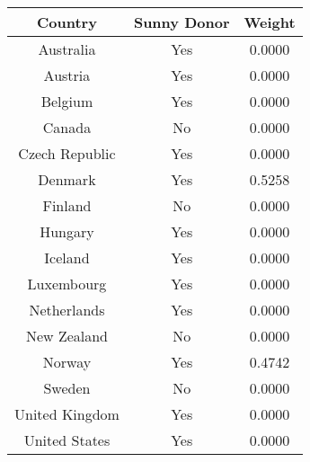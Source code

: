\begin{tabular}{c|c|c}
\textbf{Country}&\textbf{Sunny Donor}&\textbf{Weight}\\
\hline 
Australia & Yes & 0.0000 \\ 
Austria & Yes & 0.0000 \\ 
Belgium & Yes & 0.0000 \\ 
Canada & No & 0.0000 \\ 
Czech Republic & Yes & 0.0000 \\ 
Denmark & Yes & 0.5258 \\ 
Finland & No & 0.0000 \\ 
Hungary & Yes & 0.0000 \\ 
Iceland & Yes & 0.0000 \\ 
Luxembourg & Yes & 0.0000 \\ 
Netherlands & Yes & 0.0000 \\ 
New Zealand & No & 0.0000 \\ 
Norway & Yes & 0.4742 \\ 
Sweden & No & 0.0000 \\ 
United Kingdom & Yes & 0.0000 \\ 
United States & Yes & 0.0000 \\ 
\end{tabular}